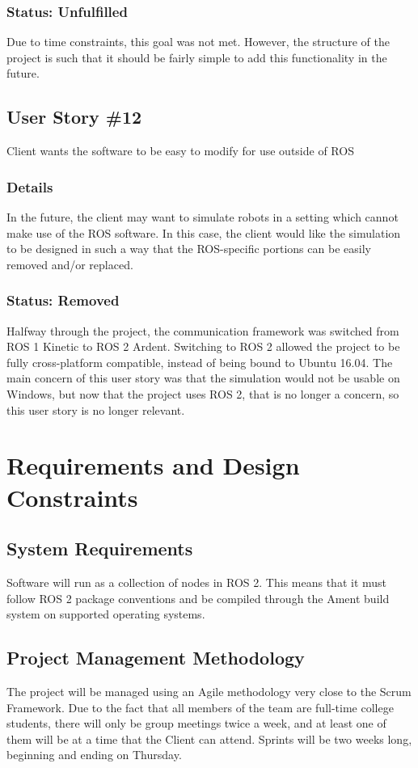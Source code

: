 \subsubsection*{Status: Unfulfilled}
Due to time constraints, this goal was not met. However, the structure of the project is such that it should be fairly simple to add this functionality in the future.

\subsection{User Story \#12} 
Client wants the software to be easy to modify for use outside of ROS

\subsubsection*{Details}
In the future, the client may want to simulate robots in a setting which cannot make use of the ROS software. In this case, the client would like the simulation to be designed in such a way that the ROS-specific portions can be easily removed and/or replaced.

\subsubsection*{Status: Removed}
Halfway through the project, the communication framework was switched from ROS 1 Kinetic to ROS 2 Ardent. Switching to ROS 2 allowed the project to be fully cross-platform compatible, instead of being bound to Ubuntu 16.04. The main concern of this user story was that the simulation would not be usable on Windows, but now that the project uses ROS 2, that is no longer a concern, so this user story is no longer relevant.

\section{Requirements and Design Constraints}
\subsection{System  Requirements}
Software will run as a collection of nodes in ROS 2. This means that it must follow ROS 2 package conventions and be compiled through the Ament build system on supported operating systems.

\subsection{Project  Management Methodology}
The project will be managed using an Agile methodology very close to the Scrum Framework. Due to the fact that all members of the team are full-time college students, there will only be group meetings twice a week, and at least one of them will be at a time that the Client can attend. Sprints will be two weeks long, beginning and ending on Thursday.

